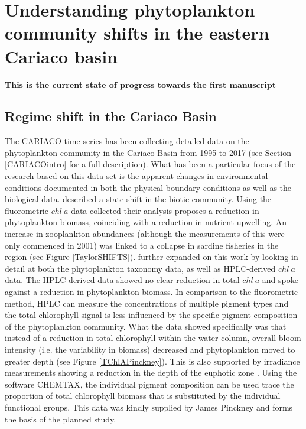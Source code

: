 \chapter{Understanding phytoplankton community shifts in the eastern Cariaco basin}

\small {\textbf{This is the current state of progress towards the first manuscript}}


\normalsize
\section{Regime shift in the Cariaco Basin}
The CARIACO time-series has been collecting detailed data on the phytoplankton community in the Cariaco Basin from 1995 to 2017 (see Section \ref{CARIACOintro} for a full description). What has been a particular focus of the research based on this data set is the apparent changes in environmental conditions documented in both the physical boundary conditions as well as the biological data. \citet{Taylor2012} described a state shift in the biotic community. Using the fluorometric $chl~a$ data collected their analysis proposes a reduction in phytoplankton biomass, coinciding with a reduction in nutrient upwelling. An increase in zooplankton abundances (although the measurements of this were only commenced in 2001) was linked to a collapse in sardine fisheries in the region (see Figure \ref{TaylorSHIFTS}). \citet{Pinckney2015} further expanded on this work by looking in detail at both the phytoplankton taxonomy data, as well as HPLC-derived $chl~a$ data. The HPLC-derived data showed no clear reduction in total $chl~a$ and spoke against a reduction in phytoplankton biomass. In comparison to the fluorometric method, HPLC can measure the concentrations of multiple pigment types and the total chlorophyll signal is less influenced by the specific pigment composition of the phytoplankton community. What the data showed specifically was that instead of a reduction in total chlorophyll within the water column, overall bloom intensity (i.e. the variability in biomass) decreased and phytoplankton moved to greater depth (see Figure \ref{TChlAPinckney}). This is also supported by irradiance measurements showing a reduction in the depth of the euphotic zone \citep{Pinckney2015}. Using the software CHEMTAX, the individual pigment composition can be used trace the proportion of total chlorophyll biomass that is substituted by the individual functional groups. This data was kindly supplied by James Pinckney and forms the basis of the planned study.

